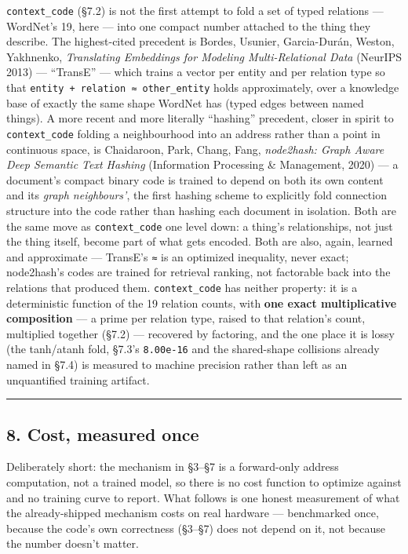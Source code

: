 \documentclass[
  10pt,
]{article}
\begin{document}
\texttt{context\_code} (§7.2) is not the first attempt to fold a set of
typed relations --- WordNet's 19, here --- into one compact number
attached to the thing they describe. The highest-cited precedent is
Bordes, Usunier, Garcia-Durán, Weston, Yakhnenko, \emph{Translating
Embeddings for Modeling Multi-Relational Data} (NeurIPS 2013) ---
``TransE'' --- which trains a vector per entity and per relation type so
that \texttt{entity\ +\ relation\ ≈\ other\_entity} holds approximately,
over a knowledge base of exactly the same shape WordNet has (typed edges
between named things). A more recent and more literally ``hashing''
precedent, closer in spirit to \texttt{context\_code} folding a
neighbourhood into an address rather than a point in continuous space,
is Chaidaroon, Park, Chang, Fang, \emph{node2hash: Graph Aware Deep
Semantic Text Hashing} (Information Processing \& Management, 2020) ---
a document's compact binary code is trained to depend on both its own
content and its \emph{graph neighbours'}, the first hashing scheme to
explicitly fold connection structure into the code rather than hashing
each document in isolation. Both are the same move as
\texttt{context\_code} one level down: a thing's relationships, not just
the thing itself, become part of what gets encoded. Both are also,
again, learned and approximate --- TransE's \texttt{≈} is an optimized
inequality, never exact; node2hash's codes are trained for retrieval
ranking, not factorable back into the relations that produced them.
\texttt{context\_code} has neither property: it is a deterministic
function of the 19 relation counts, with \textbf{one exact
multiplicative composition} --- a prime per relation type, raised to
that relation's count, multiplied together (§7.2) --- recovered by
factoring, and the one place it is lossy (the tanh/atanh fold, §7.3's
\texttt{8.00e-16} and the shared-shape collisions already named in §7.4)
is measured to machine precision rather than left as an unquantified
training artifact.

\begin{center}\rule{0.5\linewidth}{0.5pt}\end{center}

\hypertarget{cost-measured-once}{%
\subsection{8. Cost, measured once}\label{cost-measured-once}}

Deliberately short: the mechanism in §3--§7 is a forward-only address
computation, not a trained model, so there is no cost function to
optimize against and no training curve to report. What follows is one
honest measurement of what the already-shipped mechanism costs on real
hardware --- benchmarked once, because the code's own correctness
(§3--§7) does not depend on it, not because the number doesn't matter.
\end{document}
